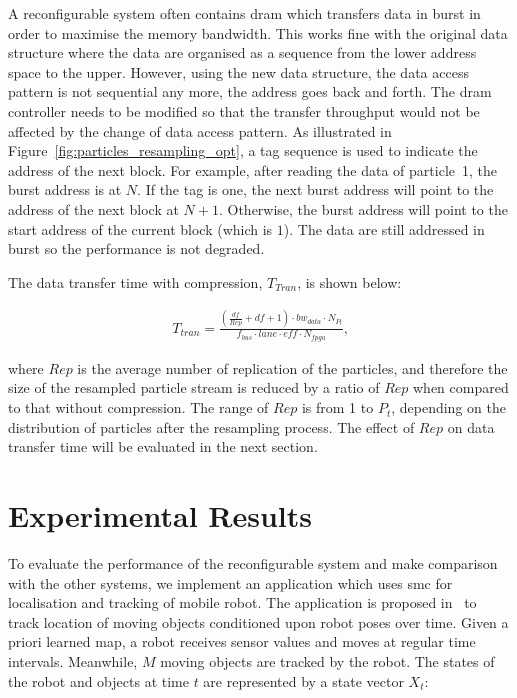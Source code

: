 A reconfigurable system often contains \gls{dram} which transfers data in burst in order to maximise the memory bandwidth.
This works fine with the original data structure where the data are organised as a sequence from the lower address space to the upper.
However, using the new data structure, the data access pattern is not sequential any more, the address goes back and forth.
The \gls{dram} controller needs to be modified so that the transfer throughput would not be affected by the change of data access pattern.
As illustrated in Figure~\ref{fig:particles_resampling_opt}, a tag sequence is used to indicate the address of the next block.
For example, after reading the data of particle~1, the burst address is at $N$.
If the tag is one, the next burst address will point to the address of the next block at $N+1$.
Otherwise, the burst address will point to the start address of the current block (which is $1$).
The data are still addressed in burst so the performance is not degraded.

The data transfer time with compression, $T_{Tran}$, is shown below:

\begin{equation}
\begin{aligned}
T_{tran} = \frac{(\frac{df}{Rep} + df + 1) \cdot bw_{data} \cdot {N_{P_t}}}{f_{bus} \cdot lane \cdot eff \cdot N_{fpga}} \mbox{,}
\end{aligned}
\label{eqt:data_opt}
\end{equation}

where $Rep$ is the average number of replication of the particles,
and therefore the size of the resampled particle stream is reduced by a ratio of $Rep$ when compared to that without compression.
The range of $Rep$ is from 1 to $P_t$, depending on the distribution of particles after the resampling process.
The effect of $Rep$ on data transfer time will be evaluated in the next section.

\section{Experimental Results}
\label{sec:reconfig_results}

To evaluate the performance of the reconfigurable system and make comparison with the other systems, 
we implement an application which uses \gls{smc} for localisation and tracking of mobile robot.
The application is proposed in~\cite{montemerlo02} to track location of moving objects conditioned upon robot poses over time.
Given a priori learned map, a robot receives sensor values and moves at regular time intervals. 
Meanwhile, $M$ moving objects are tracked by the robot.
The states of the robot and objects at time $t$ are represented by a state vector $X_t$:
 
